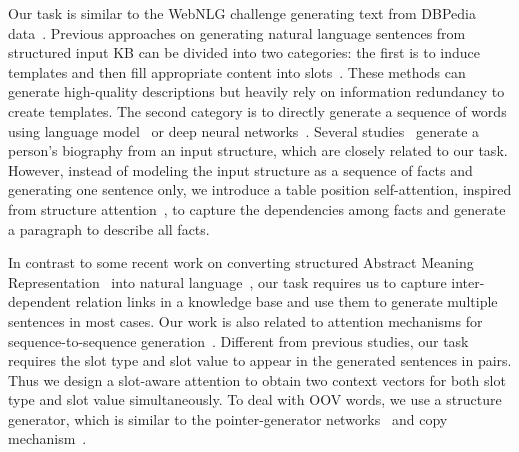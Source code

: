 \documentclass[11pt,a4paper]{article}
\begin{document}
Our task is similar to the WebNLG challenge generating text from DBPedia data~\cite{gardent2017creating}. Previous approaches on generating natural language sentences from structured input KB can be divided into two categories: the first is to induce templates and then fill appropriate content into slots~\cite{kukich1983design,cawsey1997natural,prob110,link13,konstas2013global,flanigan2016generation}. These methods can generate high-quality descriptions but heavily rely on information redundancy to create templates. The second category is to directly generate a sequence of words using language model~\cite{belz2008automatic, chen2008learning,liang2009learning,prob110,P12-1039,concept12,konstas2013global, concept13,sta16} or deep neural networks~\cite{sutskever2011generating,wensclstm15, checklist16, Alignment16, P17-1017, data2docu17,P18-2042, song2018graph}. 
Several studies~\cite{biogen16,17onebio,kaffee2018learning,kaffee2018mind,table2text17,sha2017order} generate a person's biography from an input structure, which are closely related to our task. However, instead of modeling the input structure as a sequence of facts and generating one sentence only, we introduce a table position self-attention, inspired from structure attention~\cite{lin2017structured,kim2017structured,vaswani2017attention,shen2018disan, shen2018bidirectional}, to capture the dependencies among facts and generate a paragraph to describe all facts. 









In contrast to some recent work on converting structured Abstract Meaning Representation~\cite{Banarescu2013} into natural language~\cite{Pourdamghani2016,Flanigan2016}, our task requires us to capture inter-dependent relation links in a knowledge base and use them to generate multiple sentences in most cases. Our work is also related to attention mechanisms for sequence-to-sequence generation~\cite{atten15,Alignment16,ma2017improving}. Different from previous studies, our task requires the slot type and slot value to appear in the generated sentences in pairs. Thus we design a slot-aware attention to obtain two context vectors for both slot type and slot value simultaneously. 
To deal with OOV words, we use a structure generator, which is similar to the pointer-generator networks~\cite{pointer15,rare15, gulcehre2016pointing, hybridp17} and copy mechanism~\cite{copy16}.
\end{document}
